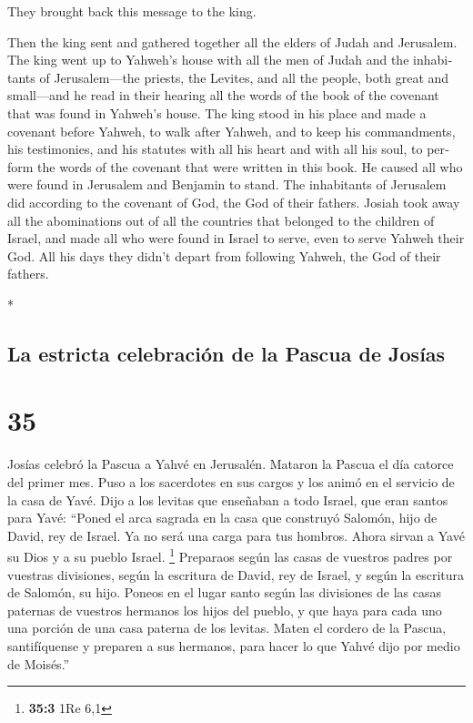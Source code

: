 \begin{paracol}{2}
\begin{otherlanguage}{english}
They brought back this message to the king.

 Then the king sent and gathered together all the elders
of Judah and Jerusalem.  The king went up to Yahweh's
house with all the men of Judah and the inhabitants of Jerusalem---the
priests, the Levites, and all the people, both great and small---and he
read in their hearing all the words of the book of the covenant that was
found in Yahweh's house.  The king stood in his place and
made a covenant before Yahweh, to walk after Yahweh, and to keep his
commandments, his testimonies, and his statutes with all his heart and
with all his soul, to perform the words of the covenant that were
written in this book.  He caused all who were found in
Jerusalem and Benjamin to stand. The inhabitants of Jerusalem did
according to the covenant of God, the God of their fathers.
 Josiah took away all the abominations out of all the
countries that belonged to the children of Israel, and made all who were
found in Israel to serve, even to serve Yahweh their God. All his days
they didn't depart from following Yahweh, the God of their fathers.

\end{otherlanguage}

\switchcolumn[0]*

\hypertarget{la-estricta-celebraciuxf3n-de-la-pascua-de-josuxedas}{%
\subsection{La estricta celebración de la Pascua de
Josías}\label{la-estricta-celebraciuxf3n-de-la-pascua-de-josuxedas}}

\hypertarget{section-68}{%
\section{35}\label{section-68}}

 Josías celebró la Pascua a Yahvé en Jerusalén. Mataron la
Pascua el día catorce del primer mes.  Puso a los
sacerdotes en sus cargos y los animó en el servicio de la casa de Yavé.
 Dijo a los levitas que enseñaban a todo Israel, que eran
santos para Yavé: ``Poned el arca sagrada en la casa que construyó
Salomón, hijo de David, rey de Israel. Ya no será una carga para tus
hombros. Ahora sirvan a Yavé su Dios y a su pueblo Israel. \footnote{\textbf{35:3}
  1Re 6,1}  Preparaos según las casas de vuestros padres
por vuestras divisiones, según la escritura de David, rey de Israel, y
según la escritura de Salomón, su hijo.  Poneos en el
lugar santo según las divisiones de las casas paternas de vuestros
hermanos los hijos del pueblo, y que haya para cada uno una porción de
una casa paterna de los levitas.  Maten el cordero de la
Pascua, santifíquense y preparen a sus hermanos, para hacer lo que Yahvé
dijo por medio de Moisés.''


\end{paracol}
